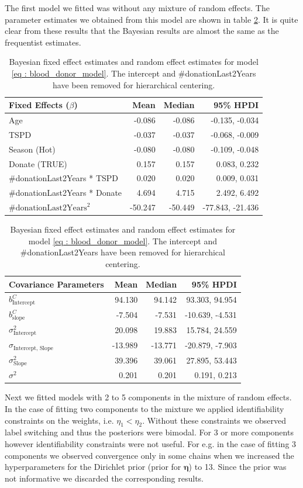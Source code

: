 The first model we fitted was without any mixture of random effects. The parameter estimates we obtained from this model are shown in table \ref{table : bayesian fixed effects}. It is quite clear from these results that the Bayesian results are almost the same as the frequentist estimates.

\begin{table}[!htb]
\centering
\captionsetup{justification=centering}
\caption{Bayesian fixed effect estimates and random effect estimates for model \ref{eq : blood_donor_model}. The intercept and \#donationLast2Years have been removed for hierarchical centering.}
\label{table : bayesian fixed effects}
\begin{tabular}{@{}lrrr@{}}
\toprule
Fixed Effects ($\beta$) & Mean & Median & 95\% HPDI \\ \midrule
Age & -0.086 & -0.086 & -0.135, -0.034\\
TSPD & -0.037 & -0.037 & -0.068, -0.009 \\
Season (Hot) & -0.080 & -0.080 & -0.109, -0.048\\
Donate (TRUE) & 0.157 & 0.157 & 0.083, 0.232 \\
\#donationLast2Years * TSPD & 0.020 & 0.020 & 0.009, 0.031  \\
\#donationLast2Years * Donate & 4.694 & 4.715 & 2.492, 6.492 \\
$\text{\#donationLast2Years}^2$ & -50.247 & -50.449 & -77.843, -21.436 \\ \bottomrule
\end{tabular}

\begin{tabular}{@{}lrrr@{}}
\toprule
Covariance Parameters & Mean & Median & 95\% HPDI \\ \midrule
$b_{\text{Intercept}}^C$& 94.130 & 94.142 & 93.303, 94.954\\
$b_{\text{slope}}^C$ & -7.504 & -7.531 & -10.639, -4.531\\
$\sigma^2_\text{Intercept}$ & 20.098 & 19.883 & 15.784, 24.559\\
$\sigma_\text{Intercept, Slope}$ & -13.989 & -13.771 & -20.879, -7.903\\
$\sigma^2_\text{Slope}$ & 39.396 & 39.061 & 27.895, 53.443\\
$\sigma^2$ & 0.201 & 0.201 & 0.191, 0.213\\ \bottomrule
\end{tabular}
\end{table}

Next we fitted models with 2 to 5 components in the mixture of random effects. In the case of fitting two components to the mixture we applied identifiability constraints on the weights, i.e. $\eta_1 < \eta_2$. Without these constraints we observed label switching and thus the posteriors were bimodal. For 3 or more components however identifiability constraints were not useful. For e.g. in the case of fitting 3 components we observed convergence only in some chains when we increased the hyperparameters for the Dirichlet prior (prior for $\boldsymbol{\eta}$) to 13. Since the prior was not informative we discarded the corresponding results. 

